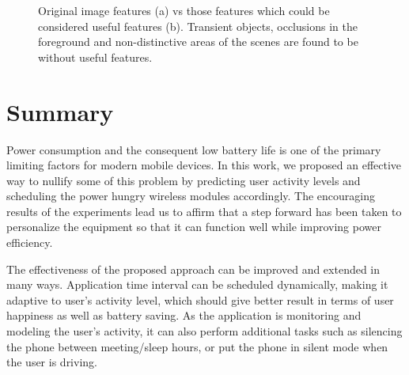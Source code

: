 \begin{figure}[h]
\centering
{}
\caption{Original image features (a) vs those features which could 
be considered useful features (b). Transient objects, occlusions in the 
foreground and non-distinctive areas of the scenes are found to 
be without useful features.}
\label{fig:learning_rate_hiddenlayer01}
\end{figure}



\section{Summary}
Power consumption and the consequent low battery life is one of the primary limiting factors for modern mobile devices.
In this work, we proposed an effective way to nullify some of this problem by predicting user activity levels and scheduling
the power hungry wireless modules accordingly. The encouraging results of the experiments lead us to affirm that a step
forward has been taken to personalize the equipment so that it can function well while improving power efficiency.

The effectiveness of the proposed approach can be improved and extended in many ways. Application time interval
can be scheduled dynamically, making it adaptive to user's activity level, which should give better result in terms of user happiness
as well as battery saving. As the application is monitoring and modeling the user's activity, it can also perform additional tasks
such as silencing the phone between meeting/sleep hours, or put the phone in silent mode when the user is driving.
